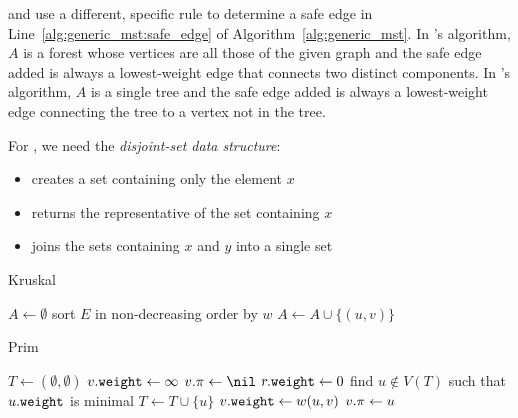  and  use a different, specific rule to determine a safe edge in Line~\ref{alg:generic_mst:safe_edge} of Algorithm~\ref{alg:generic_mst}.
In 's algorithm, \(A\) is a forest whose vertices are all those of the given graph and the safe edge added is always a lowest-weight edge that connects two distinct components.
In 's algorithm, \(A\) is a single tree and the safe edge added is always a lowest-weight edge connecting the tree to a vertex not in the tree.

For , we need the \emph{disjoint-set data structure}:
\begin{itemize}
  \item {} creates a set containing only the element \(x\)
  \item {} returns the representative of the set containing \(x\)
  \item {} joins the sets containing \(x\) and \(y\) into a single set
\end{itemize}

\begin{algorithm}[h]
\caption{Kruskal}\label{alg:kruskal}
\begin{algorithmic}[1]
  \State $A\gets\emptyset$
  \State {}
  \EndFor
  \State sort $E$ in non-decreasing order by $w$
      \State $A\gets A\cup\{(u,v)\}$
      \State {}
    \EndIf
  \EndFor
\EndFunction
\end{algorithmic}
\end{algorithm}


\begin{algorithm}[h]
\caption{Prim}\label{alg:prim}
\begin{algorithmic}[1]
  \State $T\gets(\emptyset,\emptyset)$ 
    \State $v\mathtt{.}\mathtt{weight}\gets\infty$ 
    \State $\attrib{v}{\pi}\gets\nil$ 
  \EndFor
  \State $r\mathtt{.}\mathtt{weight}\gets 0$ 
   
    \State find \(u \notin V(T)\) such that \(u\mathtt{.}\mathtt{weight}\) is minimal
    \State $T\gets T\cup\{u\}$ 
        \State $v\mathtt{.}\mathtt{weight} \gets w(u,v)$
        \State $v\mathtt{.}\mathtt{\pi} \gets u$
      \EndIf
    \EndFor
  \EndWhile
\EndFunction
\end{algorithmic}
\end{algorithm}


